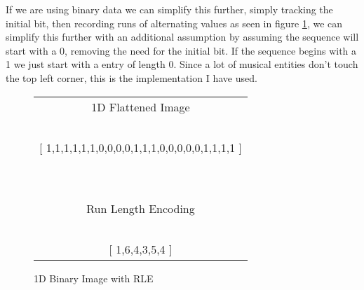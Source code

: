 If we are using binary data we can simplify this further, simply tracking the initial bit, then recording runs of alternating values as seen in figure \ref{fig:rle-1d-binary}, we can simplify this further with an additional assumption \parencite{fujinaga1996adaptive} by assuming the sequence will start with a 0, removing the need for the initial bit. If the sequence begins with a 1 we just start with a entry of length 0. Since a lot of musical entities don't touch the top left corner, this is the implementation I have used.

\begin{figure}
  \centering

  \begin{tabular}{c}

  1D Flattened Image \\
  \ \\
  {[} 1,1,1,1,1,1,0,0,0,0,1,1,1,0,0,0,0,0,1,1,1,1 {]} \\
  \ \\
  \hline
  \ \\
  Run Length Encoding \\
  \ \\
  {[} 1,6,4,3,5,4 {]} \\
  \end{tabular}
  \caption{1D Binary Image with RLE}
  \label{fig:rle-1d-binary}
\end{figure}
